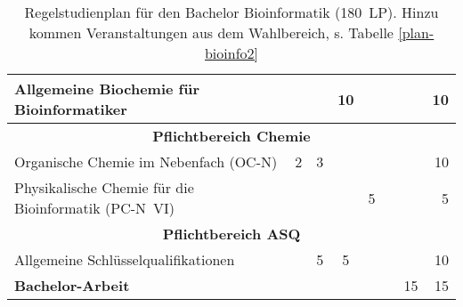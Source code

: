 \begin{table}[tbp]
\begin{small}
\begin{tabularx}{\textwidth}{|X||c|c|c|c|c|c||r|}
			Allgemeine Biochemie für Bioinformatiker                                 &    &    & 10 &    &    &                               &          10 \\ \hline\hline
			\multicolumn{8}{|c|}{\textbf{Pflichtbereich Chemie}}                                                                                            \\ \hline
			Organische Chemie im Nebenfach (OC-N)                                    & 2  & 3  &    &    &    &                               &          10 \\ \hline
			Physikalische Chemie für die Bioinformatik (PC-N~VI)                     &    &    &    & 5  &    &                               &           5 \\ \hline\hline
			\multicolumn{8}{|c|}{\textbf{Pflichtbereich ASQ}}                                                                                               \\ \hline
			Allgemeine Schlüsselqualifikationen                                      &    & 5  & 5  &    &    &                               &          10 \\ \hline\hline
			\textbf{Bachelor-Arbeit}                                                 &    &    &    &    &    &              15               &          15 \\ \hline
		\end{tabularx}
	\end{small}
	\caption{Regelstudienplan für den Bachelor Bioinformatik (180~LP). Hinzu kommen Veranstaltungen aus dem Wahlbereich, s. Tabelle \ref{plan-bioinfo2} \label{plan-bioinfo}}
\end{table}

